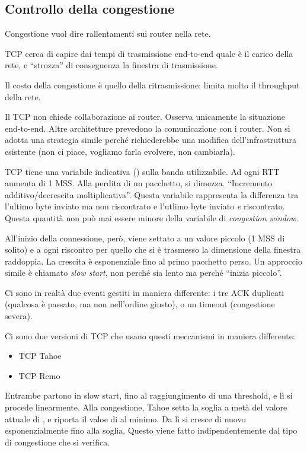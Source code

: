 \subsection{Controllo della congestione}

Congestione vuol dire rallentamenti sui router nella rete.

TCP cerca di capire dai tempi di trasmissione end-to-end quale \`e il carico della rete, e ``strozza'' di conseguenza la finestra di trasmissione.

Il costo della congestione \`e quello della ritrasmissione: limita molto il throughput della rete.

Il TCP non chiede collaborazione ai router. Osserva unicamente la situazione end-to-end. Altre architetture prevedono la comunicazione con i router. Non si adotta una strategia simile perch\'e richiederebbe una modifica dell'infrastruttura esistente (non ci piace, vogliamo farla evolvere, non cambiarla).

TCP tiene una variabile indicativa () sulla banda utilizzabile. Ad ogni RTT aumenta di 1 MSS. Alla perdita di un pacchetto, si dimezza. ``Incremento additivo/decrescita moltiplicativa''. Questa variabile rappresenta la differenza tra l'ultimo byte inviato ma non riscontrato e l'utlimo byte inviato \emph{e} riscontrato. Questa quantit\`a non pu\`o mai essere minore della variabile di \emph{congestion window}. 

All'inizio della connessione, per\`o,  viene settato a un valore piccolo (1 MSS di solito) e a ogni riscontro per quello che si \`e trasmesso la dimensione della finestra raddoppia. La crescita \`e esponenziale fino al primo pacchetto perso. Un approccio simile \`e chiamato \emph{slow start}, non perch\'e sia lento ma perch\'e ``inizia piccolo''.

Ci sono in realt\`a due eventi gestiti in maniera differente: i tre ACK duplicati (qualcosa \`e passato, ma non nell'ordine giusto), o un timeout (congestione severa).

Ci sono due versioni di TCP che usano questi meccanismi in maniera differente:
\begin{itemize}
    \item TCP Tahoe
    \item TCP Remo
\end{itemize}

Entrambe partono in slow start, fino al raggiungimento di una threshold, e l\`i si procede linearmente. Alla congestione, Tahoe setta la soglia a met\`a del valore attuale di , e riporta il valoe di  al minimo. Da l\`i si cresce di nuovo esponenzialmente fino alla soglia. Questo viene fatto indipendentemente dal tipo di congestione che si verifica.

